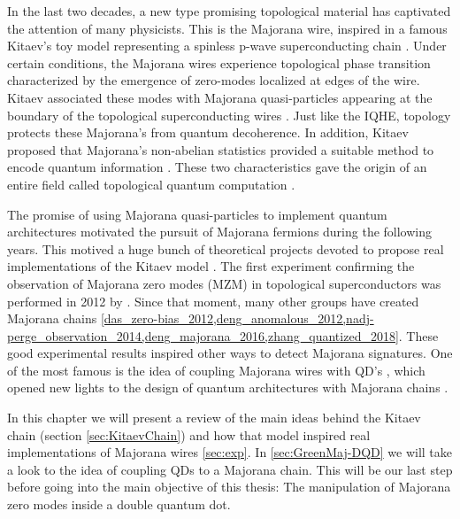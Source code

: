 In the last two decades, a new type promising topological material has captivated the attention of many physicists. This is the Majorana wire, inspired in a famous Kitaev's toy model representing a spinless p-wave superconducting chain \cite{kitaev_unpaired_2001}. Under certain conditions, the Majorana wires experience topological phase transition characterized by the emergence of  zero-modes localized at edges of the wire. Kitaev associated these modes with Majorana quasi-particles  appearing at the boundary of the topological superconducting wires . Just like the IQHE, topology protects these  Majorana's  from quantum decoherence. In addition, Kitaev proposed that  Majorana's non-abelian statistics provided a suitable method to encode quantum information \cite{kitaev_fault-tolerant_2003}. These two characteristics gave the   origin of an entire field called topological quantum computation \cite{pachos_introduction_2012}.

The promise of using Majorana quasi-particles to implement quantum architectures motivated the pursuit of Majorana fermions during the following years. This motived a huge bunch of theoretical projects devoted to propose real implementations of the Kitaev model \cite{alicea_majorana_2010,alicea_new_2012,beenakker_search_2013,sarma_majorana_2015,plugge_majorana_2017,aasen_milestones_2016}. The first experiment confirming the observation of  Majorana zero modes (MZM) in topological superconductors was performed in 2012 by \citeauthor{mourik_signatures_2012}. Since that moment, many other groups have created Majorana chains \ref{das_zero-bias_2012,deng_anomalous_2012,nadj-perge_observation_2014,deng_majorana_2016,zhang_quantized_2018}. These good experimental results inspired other ways to detect Majorana signatures. One of the most famous is the idea of coupling Majorana wires with QD's \cite{liu_detecting_2011}, which opened new lights to the design of quantum architectures with Majorana chains \cite{barkeshli_physical_2015,karzig_scalable_2017}. 

In this chapter we will present a review of the main ideas behind the Kitaev chain (section \ref{sec:KitaevChain}) and how that model inspired real implementations of Majorana wires \ref{sec:exp}.  In \ref{sec:GreenMaj-DQD} we will take a look to the idea of coupling QDs to a Majorana chain. This will be our last step before going into the main objective of this thesis: The manipulation of Majorana zero modes inside a double quantum dot. 



